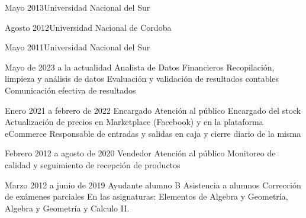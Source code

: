 \documentclass{CV_template}
\begin{document}
\begin{paracol}{2}
\begin{rightcolumn}
            {Mayo 2013}{Universidad Nacional del Sur}

            {Agosto 2012}{Universidad Nacional de Cordoba}

            {Mayo 2011}{Universidad Nacional del Sur}



    {Mayo de 2023 a la actualidad}
    {Analista de Datos Financieros}
    {Recopilación, limpieza y análisis de datos}
    {Evaluación y validación de resultados contables}
    {Comunicación efectiva de resultados}
    {}

    {Enero 2021 a febrero de 2022}
    {Encargado}
    {Atención al público}
    {Encargado del stock}
    {Actualización de precios en Marketplace (Facebook) y en la plataforma eCommerce}
    {Responsable de entradas y salidas en caja y cierre diario de la misma}
    
    {Febrero 2012 a agosto de 2020}
    {Vendedor}
    {Atención al público}
    {Monitoreo de calidad y seguimiento de recepción de productos}{}{}
    
    {Marzo 2012 a junio de 2019}
    {Ayudante alumno B}
    {Asistencia a alumnos}
    {Corrección de exámenes parciales}
    {En las asignaturas: Elementos de Algebra y Geometría, Algebra y Geometría y Calculo II.}{}


\end{rightcolumn}

\end{paracol}
\end{document}

